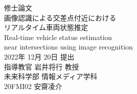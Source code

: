 \thispagestyle{empty}
\begin{center}
\vspace*{-1cm}
\Huge{修士論文}\\
\vspace{1cm}
\LARGE{画像認識による交差点付近における\\リアルタイム車両状態推定}\\
\vspace{0.2cm}
\large{Real-time vehicle status estimation \\ near intersections using image recognition}\\
\vspace{2cm}
\Large{2022年 12月 20日 提出}\\
\vspace{2cm}
\LARGE{指導教官 岩井将行 教授}\\
\vspace{1cm}
\LARGE{未来科学部 情報メディア学科}\\
\vspace{1cm}
\huge{20FMI02 安齋凌介}\\
\end{center}
